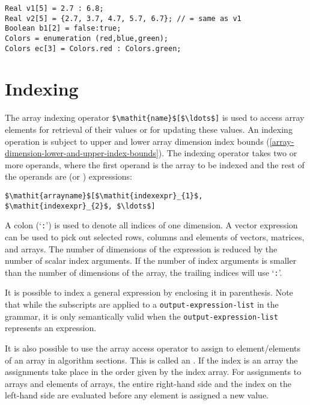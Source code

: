 \begin{example}
\begin{lstlisting}[language=modelica]
Real v1[5] = 2.7 : 6.8;
Real v2[5] = {2.7, 3.7, 4.7, 5.7, 6.7}; // = same as v1
Boolean b1[2] = false:true;
Colors = enumeration (red,blue,green);
Colors ec[3] = Colors.red : Colors.green;
\end{lstlisting}
\end{example}

\section{Indexing}\label{array-indexing}\label{indexing}

The array indexing operator \lstinline!$\mathit{name}$[$\ldots$]! is used to access array elements for retrieval of their values or for updating these values.
An indexing operation is subject to upper and lower array dimension index bounds (\cref{array-dimension-lower-and-upper-index-bounds}).
The indexing operator takes two or more operands, where the first operand is the array to be indexed and the rest of the operands are  (or ) expressions:

\lstinline!$\mathit{arrayname}$[$\mathit{indexexpr}_{1}$, $\mathit{indexexpr}_{2}$, $\ldots$]!

A colon (`\lstinline!:!') is used to denote all indices of one dimension.
A vector expression can be used to pick out selected rows, columns and elements of vectors, matrices, and arrays.
The number of dimensions of the expression is reduced by the number of scalar index arguments.
If the number of index arguments is smaller than the number of dimensions of the array, the trailing indices will use `\lstinline!:!'.

It is possible to index a general expression by enclosing it in parenthesis.
Note that while the subscripts are applied to a \lstinline[language=grammar]!output-expression-list! in the grammar, it is only semantically valid when the \lstinline[language=grammar]!output-expression-list! represents an expression.

It is also possible to use the array access operator to assign to element/elements of an array in algorithm sections.
This is called an .
If the index is an array the assignments take place in the order given by the index array.
For assignments to arrays and elements of arrays, the entire right-hand side and the index on the left-hand side are evaluated before any element is assigned a new value.

